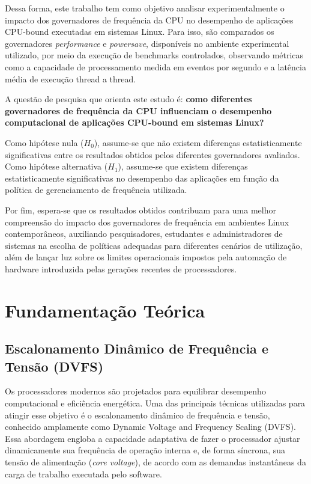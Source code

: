 \documentclass[12pt]{article}
\begin{document}
Dessa forma, este trabalho tem como objetivo analisar experimentalmente o impacto dos governadores de frequência da CPU no desempenho de aplicações CPU-bound executadas em sistemas Linux. Para isso, são comparados os governadores \textit{performance} e \textit{powersave}, disponíveis no ambiente experimental utilizado, por meio da execução de benchmarks controlados, observando métricas como a capacidade de processamento medida em eventos por segundo e a latência média de execução thread a thread.

A questão de pesquisa que orienta este estudo é: \textbf{como diferentes governadores de frequência da CPU influenciam o desempenho computacional de aplicações CPU-bound em sistemas Linux?}

Como hipótese nula ($H_0$), assume-se que não existem diferenças estatisticamente significativas entre os resultados obtidos pelos diferentes governadores avaliados. Como hipótese alternativa ($H_1$), assume-se que existem diferenças estatisticamente significativas no desempenho das aplicações em função da política de gerenciamento de frequência utilizada.

Por fim, espera-se que os resultados obtidos contribuam para uma melhor compreensão do impacto dos governadores de frequência em ambientes Linux contemporâneos, auxiliando pesquisadores, estudantes e administradores de sistemas na escolha de políticas adequadas para diferentes cenários de utilização, além de lançar luz sobre os limites operacionais impostos pela automação de hardware introduzida pelas gerações recentes de processadores.


\section{Fundamentação Teórica}

\subsection{Escalonamento Dinâmico de Frequência e Tensão (DVFS)}

Os processadores modernos são projetados para equilibrar desempenho computacional e eficiência energética. Uma das principais técnicas utilizadas para atingir esse objetivo é o escalonamento dinâmico de frequência e tensão, conhecido amplamente como Dynamic Voltage and Frequency Scaling (DVFS). Essa abordagem engloba a capacidade adaptativa de fazer o processador ajustar dinamicamente sua frequência de operação interna e, de forma síncrona, sua tensão de alimentação (\textit{core voltage}), de acordo com as demandas instantâneas da carga de trabalho executada pelo software.
\end{document}
